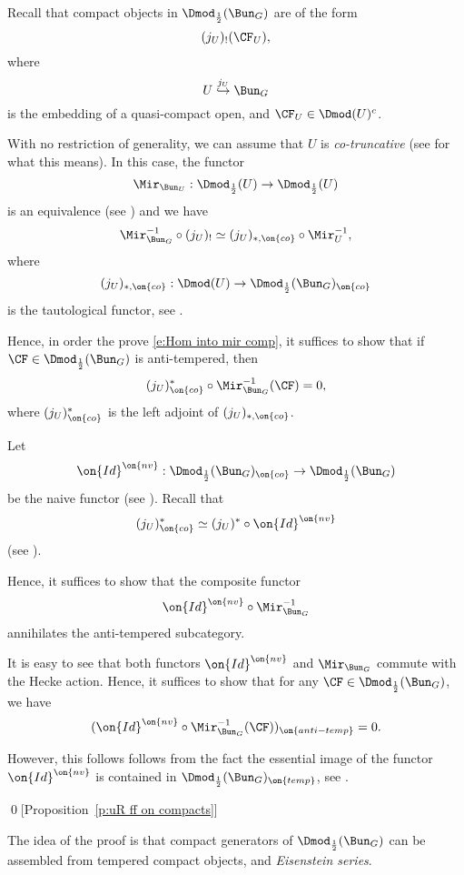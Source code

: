 \documentclass[9pt]{amsart}
\theoremstyle{remark}
\theoremstyle{definition}
\theoremstyle{remark}
\newcommand{\propref}[1]{Proposition~\ref{#1}}
\numberwithin{equation}{section}
\begin{document}
Recall that compact objects in $\Dmod_{\frac{1}{2}}(\Bun_G)$ are of the form 
$$(j_U)_!(\CF_U),$$
where 
$$U\overset{j_U}\hookrightarrow \Bun_G$$
is the embedding of a quasi-compact open, and $\CF_U\in \Dmod(U)^c$. 

\medskip

With no restriction of generality, we can assume that $U$ is \emph{co-truncative} (see \cite[Sect. 3.1]{DG1} for what this means). 
In this case, the functor
$$\Mir_{\Bun_U}:\Dmod_{\frac{1}{2}}(U)\to \Dmod_{\frac{1}{2}}(U)$$
is an equivalence (see \cite[Lemma 4.5.7]{DG1}) and we have
$$\Mir^{-1}_{\Bun_G}\circ (j_U)_!\simeq (j_U)_{*,\on{co}}\circ \Mir^{-1}_U,$$
where 
$$(j_U)_{*,\on{co}}:\Dmod(U)\to \Dmod_{\frac{1}{2}}(\Bun_G)_{\on{co}}$$
is the tautological functor, see \cite[Lemma 4.4.12]{DG1}. 

\medskip

Hence, in order the prove \eqref{e:Hom into mir comp}, it suffices to show that if $\CF\in \Dmod_{\frac{1}{2}}(\Bun_G)$
is anti-tempered, then
$$(j_U)^*_{\on{co}}\circ \Mir^{-1}_{\Bun_G}(\CF)=0,$$
where $(j_U)^*_{\on{co}}$ is the left adjoint of $(j_U)_{*,\on{co}}$. 

\sssec{}

Let 
$$\on{Id}^{\on{nv}}:\Dmod_{\frac{1}{2}}(\Bun_G)_{\on{co}}\to \Dmod_{\frac{1}{2}}(\Bun_G)$$
be the naive functor (see \cite[Sect. 2.1]{Ga1}). Recall that
$$(j_U)^*_{\on{co}}\simeq (j_U)^* \circ \on{Id}^{\on{nv}}$$
(see \cite[Corollary 2.1.5]{Ga1}). 

\medskip

Hence, it suffices to show that the composite functor 
$$\on{Id}^{\on{nv}}\circ \Mir^{-1}_{\Bun_G}$$
annihilates the anti-tempered subcategory.

\medskip

It is easy to see that both functors $\on{Id}^{\on{nv}}$ and $\Mir_{\Bun_G}$ commute with the Hecke
action. Hence, it suffices to show that for any $\CF\in \Dmod_{\frac{1}{2}}(\Bun_G)$, we have
$$(\on{Id}^{\on{nv}}\circ \Mir^{-1}_{\Bun_G}(\CF))_{\on{anti-temp}}=0.$$

\medskip

However, this follows follows from the fact the essential image of the functor $\on{Id}^{\on{nv}}$ 
is contained in $\Dmod_{\frac{1}{2}}(\Bun_G)_{\on{temp}}$, see \cite[Theorem B]{Be1}.

\qed[\propref{p:uR ff on compacts}]

\ssec{Proof of \propref{p:images}}

The idea of the proof is that compact generators of $\Dmod_{\frac{1}{2}}(\Bun_G)$ can be assembled from
tempered compact objects, and \emph{Eisenstein series}. 
\end{document}
